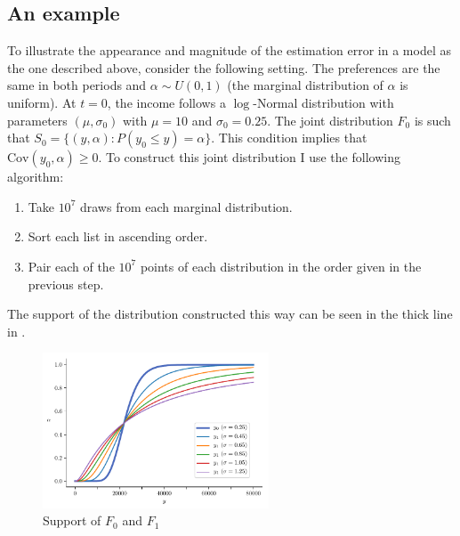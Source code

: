 \documentclass[english, a4paper, 12pt]{article}
\begin{document}
\subsection{An example} \label{ssec:RAexample}
To illustrate the appearance and magnitude of the estimation error in a model as the one described above, consider the following setting. The preferences are the same in both periods and $\alpha \sim U(0,1)$ (the marginal distribution of $\alpha$ is uniform). At $t = 0$, the income follows a $\log$-Normal distribution with parameters $(\mu, \sigma_{0})$ with $\mu = 10$ and $\sigma_{0} = 0.25$. The joint distribution $F_{0}$ is such that $S_{0} = \{(y,\alpha) : P(y_{0} \leq y) = \alpha\}$. This condition implies that $\mathrm{Cov}(y_{0}, \alpha) \geq 0$. To construct this joint distribution I use the following algorithm:
	\begin{enumerate}
		\item Take $10^{7}$ draws from each marginal distribution.
		\item Sort each list in ascending order.
		\item Pair each of the $10^{7}$ points of each distribution in the order given in the previous step.
	\end{enumerate}
The support of the distribution constructed this way can be seen in the thick line in . 
	\begin{figure}
		\caption{Support of $F_{0}$ and $F_{1}$}
		\label{fig:JointDistributions}
		\includegraphics[width = 0.6\textwidth]{RAjointDistribs}
		\vspace{-1ex}
	\end{figure}
	
\end{document}
